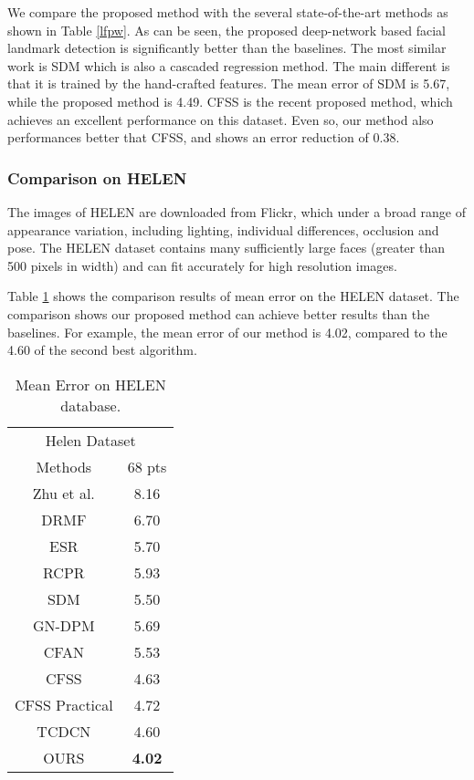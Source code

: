 \documentclass[journal]{IEEEtran}
\begin{document}
We compare the proposed method with the several state-of-the-art methods as shown in Table \ref{lfpw}. As can be seen, the proposed deep-network based facial landmark detection is significantly better than the baselines. The most similar work is SDM which is also a cascaded regression method. The main different is that it is trained by the hand-crafted features. The mean error of SDM is 5.67, while the proposed method is 4.49. CFSS is the recent proposed method, which achieves an excellent performance on this dataset. Even so, our method also performances better that CFSS, and shows an error reduction of 0.38.

\subsubsection{Comparison on HELEN}
The images of HELEN are downloaded from Flickr, which under a broad range of appearance variation, including lighting, individual differences, occlusion and pose. The HELEN dataset contains many sufficiently large faces (greater than 500 pixels in width) and can fit accurately for high resolution images.

Table \ref{helen} shows the comparison results of mean error on the HELEN dataset. The comparison shows our proposed method can achieve better results than the baselines. For example, the mean error of our method is 4.02, compared to the 4.60 of the second best algorithm.

\begin{table}[h]
\small
    \centering \caption{Mean Error on HELEN database.}
    \begin{tabular}{c c }
        \hline
\multicolumn{2}{c}{Helen Dataset} \\
Methods & 68 pts \\
        \hline
  Zhu et al. & 8.16  \\

  DRMF & 6.70  \\

  ESR & 5.70   \\

  RCPR & 5.93  \\

  SDM & 5.50  \\

  GN-DPM & 5.69 \\

 CFAN & 5.53  \\

 CFSS& 4.63  \\

  CFSS Practical  & 4.72  \\
  TCDCN  & 4.60  \\
 \hline
  OURS & \textbf{4.02 }\\
 \hline
        \end{tabular}
    \label{helen}
\end{table}
\end{document}

